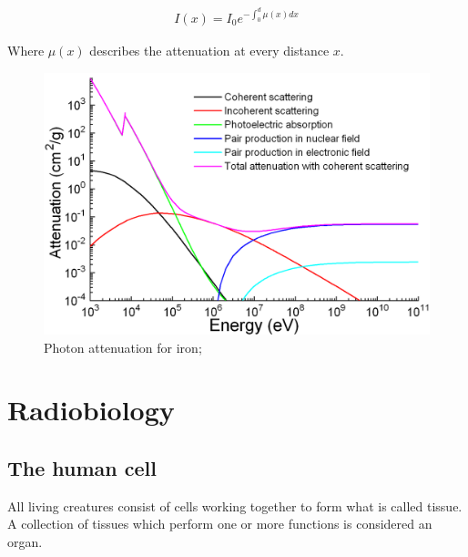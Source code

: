 \begin{align}
\label{eq:mu_int}
I(x) = I_0 e^{- \int_{0}^{d} \mu(x)dx}
\end{align}

Where $\mu(x)$ describes the attenuation at every distance $x$.


\begin{figure}[h!]
	\centering
	\includegraphics[width=0.7\linewidth]{../fig/intro/Ironattenuation}
	\caption{Photon attenuation for iron; \cite{Materialscientist}}
	\label{fig:attenuation_iron}
\end{figure}

\section{Radiobiology}
\label{sec:cell}
\subsection{The human cell}
All living creatures consist of cells working together to form what is called tissue.
A collection of tissues which perform one or more functions is considered an organ. \\

